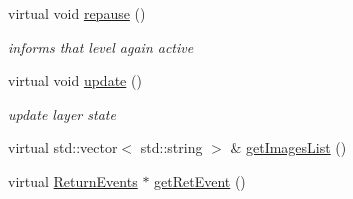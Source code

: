 \begin{DoxyCompactItemize}
\mbox{\label{class_layer_a9e197da9a85a455af77c83301ebb4d1d}} 
virtual void \hyperlink{class_layer_a9e197da9a85a455af77c83301ebb4d1d}{repause} ()
\begin{DoxyCompactList}\small\item\em informs that level again active \end{DoxyCompactList}\item 
\mbox{\label{class_layer_a4243d1a4b059eb7433cbfe7cdfc2c191}} 
virtual void \hyperlink{class_layer_a4243d1a4b059eb7433cbfe7cdfc2c191}{update} ()
\begin{DoxyCompactList}\small\item\em update layer state \end{DoxyCompactList}\item 
virtual std\+::vector$<$ std\+::string $>$ \& \hyperlink{class_layer_a9acbfda611b85762f4a39ece4ea4df33}{get\+Images\+List} ()
\item 
virtual \hyperlink{_events_8h_a51620cf702f1b8fdf47cd0a5cfa0ba4f}{Return\+Events} $\ast$ \hyperlink{class_layer_ac57343394c8dba2a180a7762cd3a20b6}{get\+Ret\+Event} ()
\end{DoxyCompactItemize}
